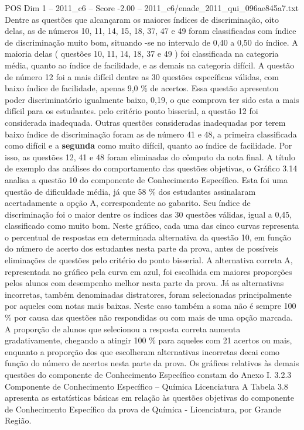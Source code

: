 \begin{textsample}{POS Dim 1 – 2011\_c6 – Score -2.00 – 2011\_c6/enade\_2011\_qui\_096ae845a7.txt}
Dentre as questões que alcançaram os maiores índices de discriminação, oito delas, as de números 10, 11, 14, 15, 18, 37, 47 e 49 foram classificadas com índice de discriminação muito bom, situando -se no intervalo de 0,40 a 0,50 do índice.
A maioria delas ( questões 10, 11, 14, 18, 37 e 49 ) foi classificada na categoria média, quanto ao índice de facilidade, e as demais na categoria difícil.
A questão de número 12 foi a mais difícil dentre as 30 questões específicas válidas, com baixo índice de facilidade, apenas 9,0 \% de acertos.
Essa questão apresentou poder discriminatório igualmente baixo, 0,19, o que comprova ter sido esta a mais difícil para os estudantes. pelo critério ponto bisserial, a questão 12 foi considerada inadequada.
Outras questões consideradas inadequadas por terem baixo índice de discriminação foram as de número 41 e 48, a primeira classificada como difícil e a \textbf{segunda} como muito difícil, quanto ao índice de facilidade.
Por isso, as questões 12, 41 e 48 foram eliminadas do cômputo da nota final.
A título de exemplo das análises do comportamento das questões objetivas, o Gráfico 3.14 analisa a questão 10 do componente de Conhecimento Específico.
Esta foi uma questão de dificuldade média, já que 58 \% dos estudantes assinalaram acertadamente a opção A, correspondente ao gabarito.
Seu índice de discriminação foi o maior dentre os índices das 30 questões válidas, igual a 0,45, classificado como muito bom.
Neste gráfico, cada uma das cinco curvas representa o percentual de respostas em determinada alternativa da questão 10, em função do número de acerto dos estudantes nesta parte da prova, antes de possíveis eliminações de questões pelo critério do ponto bisserial.
A alternativa correta A, representada no gráfico pela curva em azul, foi escolhida em maiores proporções pelos alunos com desempenho melhor nesta parte da prova.
Já as alternativas incorretas, também denominadas distratores, foram selecionadas principalmente por aqueles com notas mais baixas.
Neste caso também a soma não é sempre 100 \% por causa das questões não respondidas ou com mais de uma opção marcada.
A proporção de alunos que selecionou a resposta correta aumenta gradativamente, chegando a atingir 100 \% para aqueles com 21 acertos ou mais, enquanto a proporção dos que escolheram alternativas incorretas decai como função do número de acertos nesta parte da prova.
Os gráficos relativos às demais questões do componente de Conhecimento Específico constam do Anexo I. 3.2.3 Componente de Conhecimento Específico – Química Licenciatura A Tabela 3.8 apresenta as estatísticas básicas em relação às questões objetivas do componente de Conhecimento Específico da prova de Química - Licenciatura, por Grande Região.

\end{textsample}
